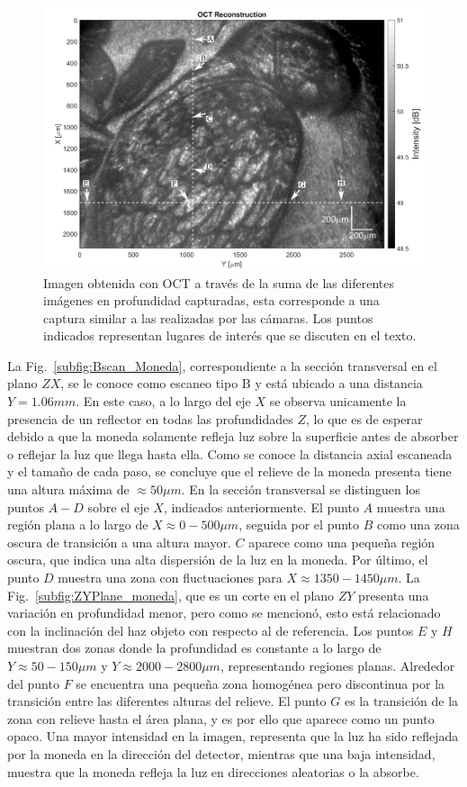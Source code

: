 \begin{figure}[!ht]
	\centering
	\includegraphics[width=0.7\linewidth]{img/chap2/OCT_Reconstruction_Moneda}
	\caption[Imagen de la moneda obtenida mediante la suma de todas las profundidades.]{Imagen obtenida con OCT a través de la suma de las diferentes imágenes en profundidad capturadas, esta corresponde a una captura similar a las realizadas por las cámaras. Los puntos indicados representan lugares de interés que se discuten en el texto.}
	\label{fig:OCT_Reconstruction_Moneda}
\end{figure}
La Fig.~\ref{subfig:Bscan_Moneda}, correspondiente a la sección transversal en el plano $ZX$, se le conoce como escaneo tipo B y está ubicado a una distancia $Y = 1.06mm$. En este caso, a lo largo del eje $X$ se observa unicamente la presencia de un reflector en todas las profundidades $Z$, lo que es de esperar debido a que la moneda solamente refleja luz sobre la superficie antes de absorber o reflejar la luz que llega hasta ella. Como se conoce la distancia axial escaneada y el tamaño de cada paso, se concluye que el relieve de la moneda presenta tiene una altura máxima de $\approx 50\mu m$. En la sección transversal se distinguen los puntos $A-D$ sobre el eje $X$, indicados anteriormente. El punto $A$ muestra una región plana a lo largo de $X\approx 0-500\mu m$, seguida por el punto $B$ como una zona oscura de transición a una altura mayor. $C$ aparece como una pequeña región oscura, que indica una alta dispersión de la luz en la moneda. Por último, el punto $D$ muestra una zona con fluctuaciones para $X\approx 1350-1450\mu m$. La Fig.~\ref{subfig:ZYPlane_moneda}, que es un corte en el plano $ZY$ presenta una variación en profundidad menor, pero como se mencionó, esto está relacionado con la inclinación del haz objeto con respecto al de referencia. Los puntos $E$ y $H$ muestran dos zonas donde la profundidad es constante a lo largo de $Y\approx 50-150\mu m$ y $Y\approx 2000-2800\mu m$, representando regiones planas. Alrededor del punto $F$ se encuentra una pequeña zona homogénea pero discontinua por la transición entre las diferentes alturas del relieve. El punto $G$ es la transición de la zona con relieve hasta el área plana, y es por ello que aparece como un punto opaco. Una mayor intensidad en la imagen, representa que la luz ha sido reflejada por la moneda en la dirección del detector, mientras que una baja intensidad, muestra que la moneda refleja la luz en direcciones aleatorias o la absorbe. 
